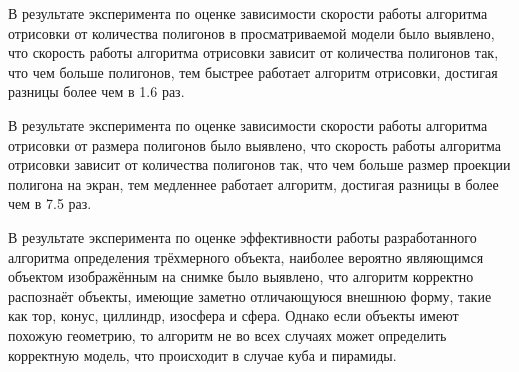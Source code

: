 В результате эксперимента по оценке зависимости скорости работы алгоритма отрисовки от количества полигонов в просматриваемой модели было выявлено, что скорость работы алгоритма отрисовки зависит от количества полигонов так, что чем больше полигонов, тем быстрее работает алгоритм отрисовки, достигая разницы более чем в 1.6 раз.

В результате эксперимента по оценке зависимости скорости работы алгоритма отрисовки от размера полигонов было выявлено, что скорость работы алгоритма отрисовки зависит от количества полигонов так, что чем больше размер проекции полигона на экран, тем медленнее работает алгоритм, достигая разницы в более чем в 7.5 раз.

В результате эксперимента по оценке эффективности работы разработанного алгоритма определения трёхмерного объекта, наиболее вероятно являющимся объектом изображённым на снимке было выявлено, что алгоритм корректно распознаёт объекты, имеющие заметно отличающуюся внешнюю форму, такие как тор, конус, циллиндр, изосфера и сфера. Однако если объекты имеют похожую геометрию, то алгоритм не во всех случаях может определить корректную модель, что происходит в случае куба и пирамиды.

